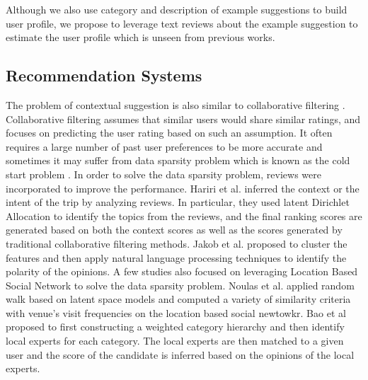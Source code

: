 Although we also use category and description of example suggestions 
to build user profile, we propose to leverage text reviews about the 
example suggestion to estimate the user profile which is unseen from 
previous works.

\subsection{Recommendation Systems} 

The problem of contextual suggestion is also similar to 
collaborative filtering \cite{Su:2009:SCF:1592474.1722966}. 
Collaborative filtering assumes that similar users
would share similar ratings, and focuses on predicting
the user rating based on such an assumption.
It often requires a large number of past user preferences to be more accurate 
and sometimes it may suffer from data sparsity problem which is known 
as the cold start problem \cite{Schein:2002:MMC:564376.564421}.
In order to solve the data sparsity problem, reviews were 
incorporated to improve the performance. 
Hariri et al. \cite{hariricontext} inferred the context or the intent 
of the trip by analyzing reviews. In particular, they used latent Dirichlet 
Allocation to identify the topics from the reviews, and the final 
ranking scores are generated based on both the context scores as well 
as the scores generated by traditional collaborative filtering methods.  
Jakob et al. \cite{Jakob:2009:BSE:1651461.1651473} proposed to 
cluster the features and then apply natural language processing 
techniques to identify the polarity of the opinions.
A few studies also focused on leveraging Location Based Social Network 
to solve the data sparsity problem. 
Noulas et al. \cite{Noulas:2012:RWA:2411131.2411620} applied random 
walk based on latent space models and computed a variety of 
similarity criteria with venue's visit frequencies on the 
location based social newtowkr. 
Bao et al \cite{Bao:2012:LPR:2424321.2424348} proposed to first 
constructing a weighted category hierarchy and then identify  
local experts for each category. The local experts are then matched 
to a given user and the score of the candidate is inferred based on the 
opinions of the local experts.


